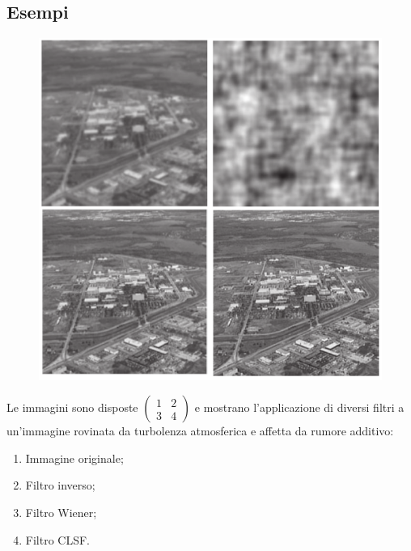 \subsection{Esempi}
\begin{figure}
	\vspace{-.8cm}
	\centering
	\includegraphics[width=.95\linewidth]{Picture/Filter_Example}
\end{figure}
Le immagini sono disposte $\left(
\begin{smallmatrix}
	1&2\\
	3&4 
\end{smallmatrix}
\right)
$ e mostrano l'applicazione di diversi filtri a un'immagine rovinata da turbolenza atmosferica e affetta da rumore additivo:
\begin{enumerate}
	\item Immagine originale;
	\item Filtro inverso;
	\item Filtro Wiener;
	\item Filtro CLSF.
\end{enumerate}

